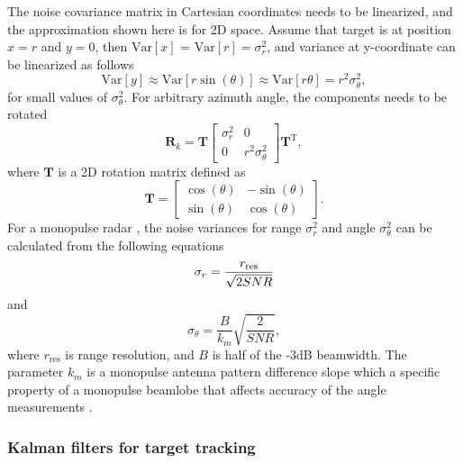 \documentclass[english, 12pt, a4paper, elec, utf8, a-1b, online]{aaltothesis}
\renewcommand{\vec}[1]{\mathbf{#1}}
\newcommand{\ocov}{\vec{R}_k}
\newcommand{\transpose}[1]{#1^\text{T}}
\newcommand{\rotmat}{\mathbf{T}}
\newcommand{\Var}[1]{\text{Var}\left[ #1 \right]}
\begin{document}
The noise covariance matrix in Cartesian coordinates needs to be linearized, and the approximation shown here is for 2D space.
Assume that target is at position $x=r$ and $y=0$, then $\Var{x}$ = $\Var{r} = \sigma_r^2$, and variance at y-coordinate can be linearized as follows
\begin{equation*}
    \Var{y} \approx \Var{r \sin\left(\theta\right)} \approx \Var{r \theta} = r^2\sigma_\theta^2,
\end{equation*} 
for small values of $\sigma_\theta^2$.
For arbitrary azimuth angle, the components needs to be rotated
\begin{equation} \label{eq:cartesian_measurement_covariance}
    \ocov = \rotmat 
    \left[
        \begin{array}{cc}
            \sigma_r^2 & 0 \\
            0 & r^2 \sigma_\theta^2
        \end{array}
    \right] 
    \transpose{\rotmat},
\end{equation}
where $\rotmat$ is a 2D rotation matrix defined as
\begin{equation}
    \rotmat = \left[
        \begin{array}{cc}
            \cos(\theta) & -\sin(\theta) \\
            \sin(\theta) & \cos(\theta)
        \end{array}
    \right].
\end{equation}
For a monopulse radar \cite{Sherman2011}, the noise variances for range $\sigma_r^2$ and angle $\sigma_\theta^2$ can be calculated from the following equations \cite{Curry2011}
\begin{equation}
    \sigma_r =  \frac{r_\text{res}}{\sqrt{2 SNR}}  \label{eq:sigma_r}\\
\end{equation}
and
\begin{equation}
    \sigma_\theta =  \frac{B}{k_m} \sqrt{\frac{2}{SNR}} \label{eq:sigma_theta},
\end{equation}
where $r_\text{res}$ is range resolution, and $B$ is half of the -3dB beamwidth. 
The parameter $k_m$ is a monopulse antenna pattern difference slope which a specific property of a monopulse beamlobe that affects accuracy of the angle measurements \cite{Sherman2011}.

\subsubsection{Kalman filters for target tracking} \label{sec:kalman_filter}
\end{document}
